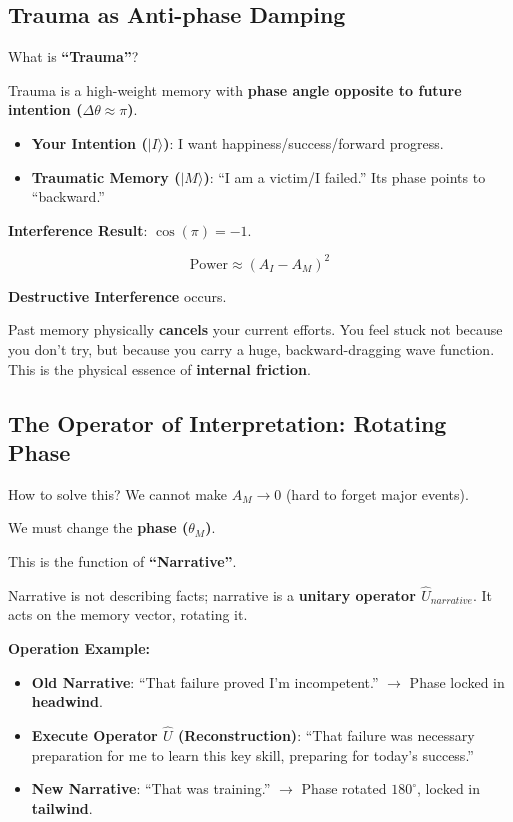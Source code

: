 \subsection{Trauma as Anti-phase Damping}

What is \textbf{``Trauma''}?

Trauma is a high-weight memory with \textbf{phase angle opposite to future intention ($\Delta \theta \approx \pi$)}.

\begin{itemize}
\item \textbf{Your Intention ($|I\rangle$)}: I want happiness/success/forward progress.

\item \textbf{Traumatic Memory ($|M\rangle$)}: ``I am a victim/I failed.'' Its phase points to ``backward.''
\end{itemize}

\textbf{Interference Result}: $\cos(\pi) = -1$.

\[\text{Power} \approx (A_I - A_M)^2\]

\textbf{Destructive Interference} occurs.

Past memory physically \textbf{cancels} your current efforts. You feel stuck not because you don't try, but because you carry a huge, backward-dragging wave function. This is the physical essence of \textbf{internal friction}.

\subsection{The Operator of Interpretation: Rotating Phase}

How to solve this? We cannot make $A_M \to 0$ (hard to forget major events).

We must change the \textbf{phase ($\theta_M$)}.

This is the function of \textbf{``Narrative''}.

Narrative is not describing facts; narrative is a \textbf{unitary operator $\hat{U}_{narrative}$}. It acts on the memory vector, rotating it.

\textbf{Operation Example:}

\begin{itemize}
\item \textbf{Old Narrative}: ``That failure proved I'm incompetent.'' $\rightarrow$ Phase locked in \textbf{headwind}.

\item \textbf{Execute Operator $\hat{U}$ (Reconstruction)}: ``That failure was necessary preparation for me to learn this key skill, preparing for today's success.''

\item \textbf{New Narrative}: ``That was training.'' $\rightarrow$ Phase rotated $180^\circ$, locked in \textbf{tailwind}.
\end{itemize}

